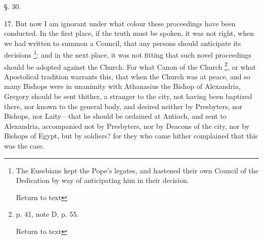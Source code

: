 §. 30.

17. But now I am ignorant under what colour these
proceedings have been conducted. In the first place, if the truth must
be spoken, it was not right, when we had written to summon a Council,
that any persons should anticipate its decisions \footnote{The Eusebians kept the Pope's legates, and hastened their own Council
of the Dedication by way of anticipating him in their decision.

Return to text}: and in the next place, it was not fitting that such novel
proceedings should be adopted against the Church. For what Canon of
the Church \footnote{p. 41, note D, p. 55.

Return to text}, or what
Apostolical tradition warrants this, that when the Church was at
peace, and so many Bishops were in unanimity with Athanasius the
Bishop of Alexandria, Gregory should be sent thither, a stranger to
the city, not having been baptized there, nor known to the general
body, and desired neither by Presbyters, nor Bishops, nor Laity—that
he should be ordained at Antioch, and sent to Alexandria, accompanied
not by Presbyters, nor by Deacons of the city, nor by Bishops of
Egypt, but by soldiers? for they who came hither complained that this
was the case.

